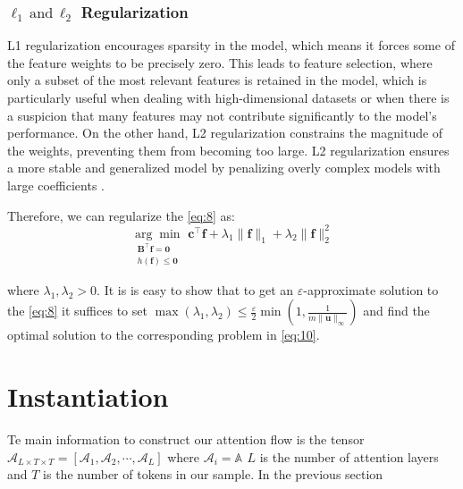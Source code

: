 \documentclass{article} %
\theoremstyle{bfnote}
\begin{document}
\subsubsection{$\ell_1 \hspace{2pt }\text{and}  \hspace{2pt}  \ell_2$ Regularization}

L1 regularization encourages sparsity in the model, which means it forces some of the feature weights to be precisely zero. This leads to feature selection, where only a subset of the most relevant features is retained in the model, which is particularly useful when dealing with high-dimensional datasets or when there is a suspicion that many features may not contribute significantly to the model's performance. On the other hand, L2 regularization constrains the magnitude of the weights, preventing them from becoming too large. L2 regularization ensures a more stable and generalized model by penalizing overly complex models with large coefficients \citep{yena}.

Therefore, we can regularize the \cref{eq:8} as:
\begin{equation}
	\underset{\substack{\bm{B}^{\top} \bm{f}=\bm{0} \\ h(\bm{f}) \leq \bm{0} }}{\arg \min } \hspace{4pt} \bm{c}^{\top} \bm{f} +\lambda_1 \|\bm{f}\|_1 +\lambda_2 \|\bm{f}\|_2^2
	\label{eq:10}
\end{equation}

where $\lambda_1, \lambda_2 >0$. It is is easy to show that to get an $\varepsilon$-approximate solution to the \cref{eq:8} it suffices to set $\max(\lambda_1, \lambda_2) \leq \frac{\varepsilon}{2} \min(1, \frac{1}{m \|\bm{u}\|_{\infty}})$ and find the optimal solution to the corresponding problem in \cref{eq:10}.\citep{boyd2004, bubeck2015}

\section{Instantiation}
Te main information to construct our attention flow is the tensor $\mathcal{A}_{L\times T \times T} = \left[\mathcal{A}_1, \mathcal{A}_2, \cdots, \mathcal{A}_L\right]$ where $\mathcal{A}_i= \mathbb{A_{}}$ $L$ is the number of attention layers and $T$ is the number of tokens in our sample. In the previous section 
\pagebreak

\end{document}
